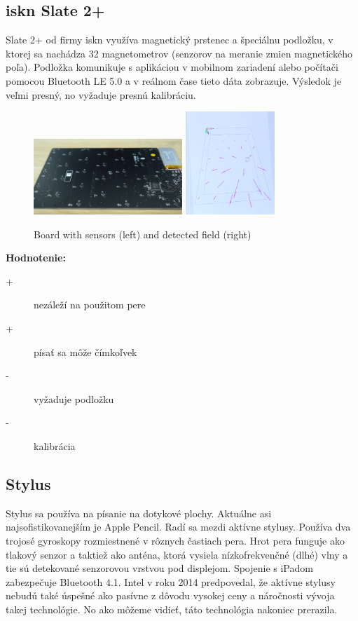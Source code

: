 \subsection*{iskn Slate 2+}

Slate 2+ od firmy iskn využíva magnetický prstenec a špeciálnu podložku, v ktorej sa nachádza 32 magnetometrov (senzorov na meranie zmien magnetického poľa). Podložka komunikuje s aplikáciou v mobilnom zariadení alebo počítači pomocou Bluetooth LE 5.0 a v reálnom čase tieto dáta zobrazuje. Výsledok je veľmi presný, no vyžaduje presnú kalibráciu.\newline

\begin{figure}[hbt]
	\centering
	\includegraphics[width=0.5\textwidth]{obrazky-figures/isknBoard.png}
	\includegraphics[width=0.3\textwidth]{obrazky-figures/isknMagneticfield.png}
	\caption{Board with sensors (left) and detected field (right)}
	\label{piezoPen1997}
\end{figure}
\textbf{Hodnotenie:}
\begin{description}
	\item[+]{nezáleží na použitom pere}
	\item[+]{písať sa môže čímkoľvek}
	\item[-]{vyžaduje podložku}
	\item[-]{kalibrácia}
\end{description}

\subsection*{Stylus}

Stylus sa používa na písanie na dotykové plochy. Aktuálne asi najsofistikovanejším je Apple Pencil. Radí sa mezdi aktívne stylusy\cite{HarleyJonahA2013As}. Používa dva trojosé gyroskopy rozmiestnené v rôznych častiach pera. Hrot pera funguje ako tlakový senzor a taktiež ako anténa, ktorá vysiela nízkofrekvenčné (dlhé) vlny a tie sú detekované senzorovou vrstvou pod displejom. Spojenie s iPadom zabezpečuje Bluetooth 4.1\cite{ApplePencilForum}. Intel v roku 2014 predpovedal, že aktívne stylusy nebudú také úspešné ako pasívne z dôvodu vysokej ceny a náročnosti vývoja takej technológie\cite{IntelDisp}. No ako môžeme vidieť, táto technológia nakoniec prerazila.\newline

